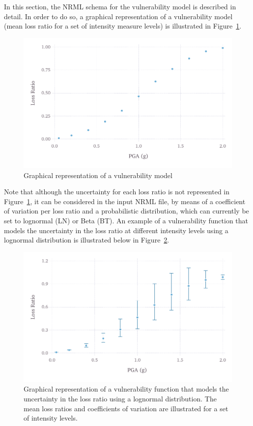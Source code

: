 In this section, the NRML schema for the \gls{vulnerability model} is
described in detail. In order to do so, a graphical representation of a
\gls{vulnerability model} (mean loss ratio for a set of intensity measure
levels) is illustrated in Figure~\ref{fig:vulnerability-zero-cov}.

\begin{figure}[ht]
\centering
\includegraphics[width=12cm]{figures/risk/vulnerability-zero-cov.pdf}
\caption{Graphical representation of a vulnerability model}
\label{fig:vulnerability-zero-cov}
\end{figure}

Note that although the uncertainty for each loss ratio is not represented in
Figure~\ref{fig:vulnerability-zero-cov}, it can be considered in the input
NRML file, by means of a coefficient of variation per loss ratio and a
probabilistic distribution, which can currently be set to lognormal (LN) or
Beta (BT). An example of a \gls{vulnerability function} that models the 
uncertainty in the loss ratio at different intensity levels using a lognormal
distribution is illustrated below in Figure~\ref{fig:vulnerability-nonzero-cov}.

\begin{figure}[ht]
\centering
\includegraphics[width=12cm]{figures/risk/vulnerability-nonzero-cov.pdf}
\caption{Graphical representation of a vulnerability function that models the uncertainty in the loss ratio using a lognormal distribution. The mean loss ratios and coefficients of variation are illustrated for a set of intensity levels.}
\label{fig:vulnerability-nonzero-cov}
\end{figure}


